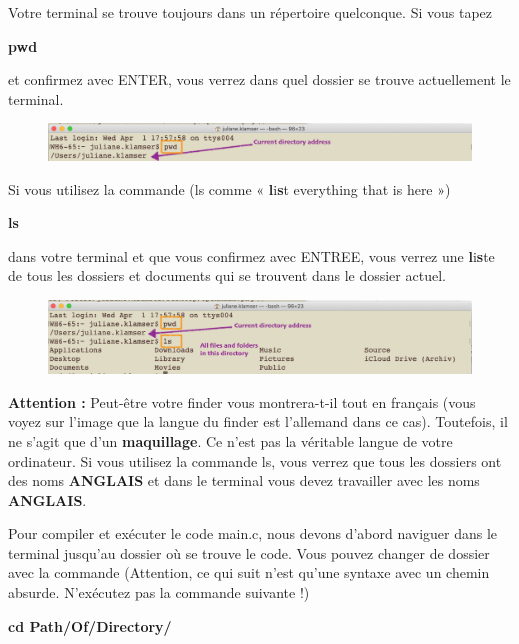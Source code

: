 \documentclass{article}
\begin{document}
Votre terminal se trouve toujours dans un répertoire quelconque. Si vous tapez 
\begin{tcolorbox}[width=\textwidth,colframe=Bittersweet,colback={black},title={Ceci est le terminal},outer arc=0mm,colupper=white]    
      \large\textbf{pwd}
\end{tcolorbox}
et confirmez avec ENTER, vous verrez dans quel dossier se trouve actuellement le terminal. 
\begin{figure}[H]
\center
\includegraphics[width=1\textwidth]{Plots/Pwd.png}
\end{figure}
Si vous utilisez la commande (ls comme « \textbf{l}i\textbf{s}t everything that is here »)
\begin{tcolorbox}[width=\textwidth,colframe=Bittersweet,colback={black},title={Ceci est le terminal},outer arc=0mm,colupper=white]    
      \large\textbf{ls}
\end{tcolorbox}
dans votre terminal et que vous confirmez avec ENTREE, vous verrez une \textbf{l}i\textbf{s}te de tous les dossiers et documents qui se trouvent dans le dossier actuel.
\begin{figure}[H]
\center
\includegraphics[width=1\textwidth]{Plots/LS.png}
\end{figure}
{\color{Bittersweet}\textbf{Attention :}} Peut-être votre finder vous montrera-t-il tout en français (vous voyez sur l'image que la langue du finder est l'allemand dans ce cas). Toutefois, il ne s'agit que d'un \textbf{maquillage}. Ce n'est pas la véritable langue de votre ordinateur. Si vous utilisez la commande ls, vous verrez que tous les dossiers ont des noms \textbf{ANGLAIS} et dans le terminal vous devez travailler avec les noms \textbf{ANGLAIS}.

Pour compiler et exécuter le code main.c, nous devons d'abord naviguer dans le terminal jusqu'au dossier où se trouve le code. Vous pouvez changer de dossier avec la commande (Attention, ce qui suit n'est qu'une syntaxe avec un chemin absurde. N'exécutez pas la commande suivante !)
\begin{tcolorbox}[width=\textwidth,colframe=Bittersweet,colback={black},title={Ceci est le terminal},outer arc=0mm,colupper=white]    
      \large\textbf{cd Path/Of/Directory/}
\end{tcolorbox}
\end{document}
